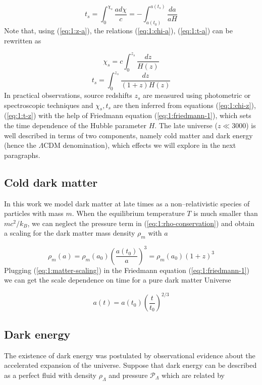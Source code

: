 \begin{equation}
\label{eq:1:t-a}
t_s = \int_{0}^{\chi_s}\frac{a d\chi}{c} = -\int_{a(t_0)}^{a(t_s)}\frac{da}{aH}  
\end{equation}
%
Note that, using (\ref{eq:1:z-a}), the relations (\ref{eq:1:chi-a}), (\ref{eq:1:t-a}) can be rewritten as 

\begin{equation}
\label{eq:1:chi-z}
\chi_s = c\int_0^{z_s}\frac{dz}{H(z)}
\end{equation} 
%
\begin{equation}
\label{eq:1:t-z}
t_s = \int_0^{z_s}\frac{dz}{(1+z)H(z)}
\end{equation} 
%
In practical observations, source redshifts $z_s$ are measured using photometric \citep{LSST} or spectroscopic \citep{DESI} techniques and $\chi_s,t_s$ are then inferred from equations (\ref{eq:1:chi-z}), (\ref{eq:1:t-z}) with the help of Friedmann equation (\ref{eq:1:friedmann-1}), which sets the time dependence of the Hubble parameter $H$. The late universe ($z\ll 3000$) is well described in terms of two components, namely cold matter and dark energy (hence the $\Lambda$CDM denomination), which effects we will explore in the next paragraphs. 

\subsection{Cold dark matter}
In this work we model dark matter at late times as a non--relativistic species of particles with mass $m$. When the equilibrium temperature $T$ is much smaller than $mc^2/k_B$, we can neglect the pressure term in (\ref{eq:1:rho-conservation}) and obtain a scaling for the dark matter mass density $\rho_m$ with $a$

\begin{equation}
\label{eq:1:matter-scaling}
\rho_m(a) = \rho_m(a_0)\left(\frac{a(t_0)}{a}\right)^3 = \rho_m(a_0)(1+z)^3 
\end{equation} 
%
Plugging (\ref{eq:1:matter-scaling}) in the Friedmann equation (\ref{eq:1:friedmann-1}) we can get the scale dependence on time for a pure dark matter Universe

\begin{equation}
\label{eq:1:matter-only-a}
a(t) = a(t_0)\left(\frac{t}{t_0}\right)^{2/3}
\end{equation}

\subsection{Dark energy}
The existence of dark energy was postulated by observational evidence about the accelerated expansion of the universe. Suppose that dark energy can be described as a perfect fluid with density $\rho_\Lambda$ and pressure $\mathcal{P}_\Lambda$ which are related by

